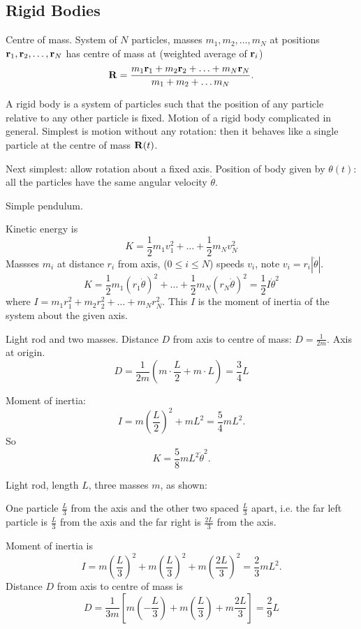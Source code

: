 \documentclass[10pt, a4paper]{article}
\begin{document}
\subsection{Rigid Bodies}

Centre of mass.
System of $N$ particles,
masses $m_1, m_2, \dotsc, m_N$ at positions $\mathbf{r}_1, \mathbf{r}_2, \dotsc, \mathbf{r}_N$ has centre of mass at
(weighted average of $\mathbf{r}_i$)
\[
\mathbf{R} = \frac{m_1\mathbf{r}_1 + m_2\mathbf{r}_2 + \dotsc + m_N\mathbf{r}_N}{m_1 + m_2 + \dotsc m_N}.
\]

A rigid body is a system of particles such that the position of any particle relative to any other particle is fixed.
Motion of a rigid body complicated in general.
Simplest is motion without any rotation:
then it behaves like a single particle at the centre of mass $\mathbf{R}(t)$.

Next simplest:
allow rotation about a fixed axis.
Position of body given by $\theta(t)$:
all the particles have the same angular velocity $\dot{\theta}$.

\begin{example}
    Simple pendulum.

    Kinetic energy is
    \[
    K = \frac{1}{2}m_1v_1 ^ 2 + \dotsc + \frac{1}{2}m_Nv_N ^ 2
    \]
    Massses $m_i$ at distance $r_i$ from axis,
    ($0 \leq i \leq N$)
    speeds $v_i$,
    note $v_i = r_i|\dot{\theta}|$.
    \[
    K = \frac{1}{2}m_1(r_1\dot{\theta}) ^ 2 + \dotsc + \frac{1}{2}m_N(r_N\dot{\theta}) ^ 2 = \frac{1}{2}I\dot{\theta} ^ 2
    \]
    where $I = m_1r_1 ^ 2 + m_2r_2 ^ 2 + \dotsc + m_Nr_N ^ 2$.
    This $I$ is the moment of inertia of the system about the given axis.
\end{example}

\begin{example}
    Light rod and two masses.
    Distance $D$ from axis to centre of mass:
    $D = \frac{1}{2m}$.
    Axis at origin.
    \[
    D = \frac{1}{2m}\left(m\cdot\frac{L}{2} + m\cdot L\right) = \frac{3}{4}L
    \]
    
    Moment of inertia:
    \[
    I = m\left(\frac{L}{2}\right) ^ 2 + mL ^ 2 = \frac{5}{4}mL ^ 2.
    \]
    So
    \[
    K = \frac{5}{8}mL ^ 2\dot{\theta} ^ 2.
    \]
\end{example}

\begin{example}
    Light rod,
    length $L$,
    three masses $m$,
    as shown:

    One particle $\frac{L}{3}$ from the axis and the other two spaced $\frac{L}{3}$ apart,
    i.e. the far left particle is $\frac{L}{3}$ from the axis and the far right is $\frac{2L}{3}$ from the axis.

    Moment of inertia is
    \[
    I = m\left(\frac{L}{3}\right) ^ 2 + m\left(\frac{L}{3}\right) ^ 2 + m\left(\frac{2L}{3}\right) ^ 2 = \frac{2}{3}mL ^ 2.
    \]
    Distance $D$ from axis to centre of mass is
    \[
    D = \frac{1}{3m}\left[m\left(-\frac{L}{3}\right) + m\left(\frac{L}{3}\right) + m\frac{2L}{3}\right] = \frac{2}{9}L
    \]
\end{example}
\end{document}
